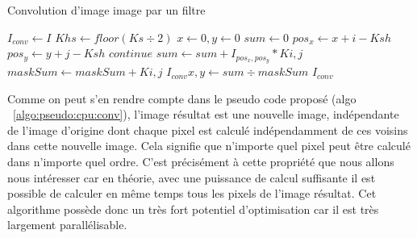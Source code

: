 \begin{algorithm}[H]
	\caption{Convolution d'image image par un filtre}
	\begin{algorithmic}
		\State $I_{conv} \gets I$
		\State $Khs \gets floor(Ks \div 2)$
		\State $x \gets 0, y \gets 0$
		\State $sum \gets 0$
					\State ${pos_x \gets x + i - Ksh}$ 
					\State ${pos_y \gets y + j - Ksh}$ 
					 
						\State $continue$
					\EndIf
					\State $sum \gets sum + I_{pos_x, pos_y} * K{i, j}$ 
					\State $maskSum \gets maskSum + K{i, j}$
					\EndFor
				\EndFor
				\State $I_{conv}{x, y} \gets sum \div maskSum$ 
			\EndFor
		\EndFor
		\State \Return $I_{conv}$ 
		\EndProcedure
	\end{algorithmic}
	\label{algo:pseudo:cpu:conv}
\end{algorithm}

Comme on peut s'en rendre compte dans le pseudo code proposé (algo ~\ref{algo:pseudo:cpu:conv}), l'image résultat est une nouvelle image, indépendante de l'image d'origine dont chaque pixel est calculé indépendamment de ces voisins dans cette nouvelle image. Cela signifie que n'importe quel pixel peut être calculé dans n'importe quel ordre. C'est précisément à cette propriété que nous allons nous intéresser car en théorie, avec une puissance de calcul suffisante il est possible de calculer en même temps tous les pixels de l'image résultat. Cet algorithme possède donc un très fort potentiel d'optimisation car il est très largement parallélisable.


